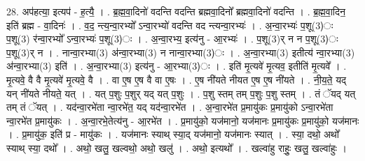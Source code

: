 \documentclass[17pt]{extarticle}
\begin{document}
28. अप॑हत्या॒ इत्यप॑ - ह॒त्यै॒ । . ब्र॒ह्म॒वा॒दिनो॑ वदन्ति वदन्ति ब्रह्मवा॒दिनो᳚ ब्रह्मवा॒दिनो॑ वदन्ति । . ब्र॒ह्म॒वा॒दिन॒ इति॑ ब्रह्म - वा॒दिनः॑ । . व॒द॒ न्त्य॒न्वा॒रभ्यो᳚ ऽन्वा॒रभ्यो॑ वदन्ति वद न्त्यन्वा॒रभ्यः॑ । . अ॒न्वा॒रभ्यः॑ प॒शू(3)ः प॒शू(3) र॑न्वा॒रभ्यो᳚ ऽन्वा॒रभ्यः॑ प॒शू(3)ः । . अ॒न्वा॒रभ्य॒ इत्य॑नु - आ॒रभ्यः॑ । . प॒शू(3)र् न न प॒शू(3)ः प॒शू(3)र् न । . नान्वा॒रभ्या(3) अ॑न्वा॒रभ्या(3) न नान्वा॒रभ्या(3)ः । . अ॒न्वा॒रभ्या(3) इतीत्य॑ न्वा॒रभ्या(3) अ॑न्वा॒रभ्या(3) इति॑ । . अ॒न्वा॒रभ्या(3) इत्य॑नु - आ॒रभ्या(3)ः । . इति॑ मृ॒त्यवे॑ मृ॒त्यव॒ इतीति॑ मृ॒त्यवे᳚ । . मृ॒त्यवे॒ वै वै मृ॒त्यवे॑ मृ॒त्यवे॒ वै । . वा ए॒ष ए॒ष वै वा ए॒षः । . ए॒ष नी॑यते नीयत ए॒ष ए॒ष नी॑यते । . नी॒य॒ते॒ यद् यन् नी॑यते नीयते॒ यत् । . यत् प॒शुः प॒शुर् यद् यत् प॒शुः । . प॒शु स्तम् तम् प॒शुः प॒शु स्तम् । . तं ॅयद् यत् तम् तं ॅयत् । . यद॑न्वा॒रभे॑ता न्वा॒रभे॑त॒ यद् यद॑न्वा॒रभे॑त । . अ॒न्वा॒रभे॑त प्र॒मायु॑कः प्र॒मायु॑को ऽन्वा॒रभे॑ता न्वा॒रभे॑त प्र॒मायु॑कः । . अ॒न्वा॒रभे॒तेत्य॑नु - आ॒रभे॑त । . प्र॒मायु॑को॒ यज॑मानो॒ यज॑मानः प्र॒मायु॑कः प्र॒मायु॑को॒ यज॑मानः । . प्र॒मायु॑क॒ इति॑ प्र - मायु॑कः । . यज॑मानः स्याथ् स्या॒द् यज॑मानो॒ यज॑मानः स्यात् । . स्या॒ दथो॒ अथो᳚ स्याथ् स्या॒ दथो᳚ । . अथो॒ खलु॒ खल्वथो॒ अथो॒ खलु॑ । . अथो॒ इत्यथो᳚ । . खल्वा॑हु राहुः॒ खलु॒ खल्वा॑हुः । \newline
\end{document}
